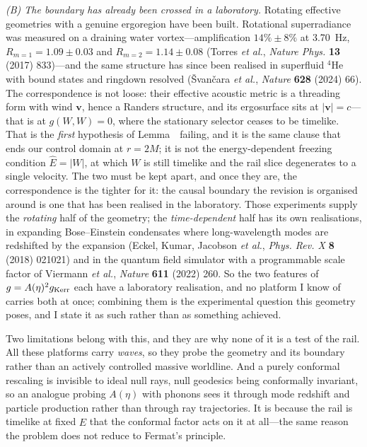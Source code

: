 \documentclass[11pt]{article}
\begin{document}
\emph{(B) The boundary has already been crossed in a laboratory.} Rotating effective
geometries with a genuine ergoregion have been built. Rotational superradiance was
measured on a draining water vortex---amplification $14\%\pm8\%$ at 3.70~Hz,
$R_{m=1}=1.09\pm0.03$ and $R_{m=2}=1.14\pm0.08$ (Torres \emph{et al.},
\emph{Nature Phys.} \textbf{13} (2017) 833)---and the same structure has since been
realised in superfluid $^4$He with bound states and ringdown resolved
(\v{S}van\v{c}ara \emph{et al.}, \emph{Nature} \textbf{628} (2024) 66). The
correspondence is not loose: their effective acoustic metric is a threading form
with wind $\boldsymbol v$, hence a Randers structure, and its ergosurface sits at
$|\boldsymbol v|=c$---that is at $g(W,W)=0$, where the stationary selector ceases to
be timelike. That is the \emph{first} hypothesis of Lemma~\msLemCompact\ failing, and
it is the same clause that ends our control domain at $r=2M$; it is not the
energy-dependent freezing condition $\hat E=|W|$, at which $W$ is still timelike and
the rail slice degenerates to a single velocity. The two must be kept apart, and once
they are, the correspondence is the tighter for it: the causal boundary the revision is organised around is one that has been realised
in the laboratory. Those experiments supply the
\emph{rotating} half of the geometry; the \emph{time-dependent} half has its own
realisations, in expanding Bose--Einstein condensates where long-wavelength modes
are redshifted by the expansion (Eckel, Kumar, Jacobson \emph{et al.},
\emph{Phys. Rev. X} \textbf{8} (2018) 021021) and in the quantum field simulator
with a programmable scale factor of Viermann \emph{et al.}, \emph{Nature}
\textbf{611} (2022) 260. So the two features of $g=A(\eta)^2g_{\rm Kerr}$ each have
a laboratory realisation, and no platform I know of carries both at once; combining
them is the experimental question this geometry poses, and I state it as such rather
than as something achieved.

Two limitations belong with this, and they are why none of it is a test of the rail.
All these platforms carry \emph{waves}, so they probe the geometry and its boundary
rather than an actively controlled massive worldline. And a purely conformal
rescaling is invisible to ideal null rays, null geodesics being conformally
invariant, so an analogue probing $A(\eta)$ with phonons sees it through mode
redshift and particle production rather than through ray trajectories. It is because
the rail is timelike at fixed $\hat E$ that the conformal factor acts on it at
all---the same reason the problem does not reduce to Fermat's principle.
\end{document}
